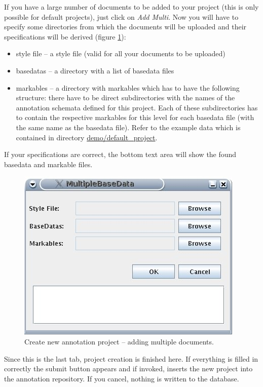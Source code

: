 \documentclass[DIV12,english,11pt,halfparskip]{scrartcl}
\begin{document}
If you have a large number of documents to be added to your project
(this is only possible for default projects), just click on \emph{Add
  Multi}. Now you will have to specify some directories from which the
documents will be uploaded and their specifications will be derived
(figure \ref{fig:createproject_addmultidoc}):
\begin{itemize}
\item style file -- a style file (valid for all your documents to be uploaded)
\item basedatas -- a directory with a list of basedata files
\item markables -- a directory with markables which has to have the
  following structure: there have to be direct subdirectories with the
  names of the annotation schemata defined for this project. Each of
  these subdirectories has to contain the respective markables for
  this level for each basedata file (with the same name as the
  basedata file). Refer to the example data which is contained in
  directory \url{demo/default_project}.
\end{itemize}

If your specifications are correct, the bottom text area will show the
found basedata and markable files.


\begin{figure}[h]
  \centering
  \includegraphics[scale=0.5]{figs/AddMultipleBaseData.jpg}
  \caption{Create new annotation project -- adding multiple
    documents.}
  \label{fig:createproject_addmultidoc}
\end{figure}


Since this is the last tab, project creation is finished here. If
everything is filled in correctly the submit button appears and if
invoked, inserts the new project into the annotation repository. If
you cancel, nothing is written to the database.
\end{document}
